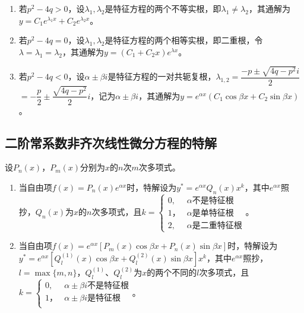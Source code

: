\documentclass[UTF8, 12pt]{ctexart}
\begin{document}
\begin{enumerate}
    \item 若$p^2-4q>0$，设$\lambda_1,\lambda_2$是特征方程的两个不等实根，即$\lambda_1\neq\lambda_2$，其通解为$y=C_1e^{\lambda_1x}+C_2e^{\lambda_2x}$。
    \item 若$p^2-4q=0$，设$\lambda_1,\lambda_2$是特征方程的两个相等实根，即二重根，令$\lambda=\lambda_1=\lambda_2$，其通解为$y=(C_1+C_2x)e^{\lambda x}$。
    \item 若$p^2-4q<0$，设$\alpha\pm\beta i$是特征方程的一对共轭复根，$\lambda_{1,2}=\dfrac{-p\pm\sqrt{4q-p^2}i}{2}$\\$=-\dfrac{p}{2}\pm\dfrac{\sqrt{4q-p^2}}{2}i$，记为$\alpha\pm\beta i$，其通解为$y=e^{\alpha x}(C_1\cos\beta x+C_2\sin\beta x)$。
\end{enumerate}

\subsection{二阶常系数非齐次线性微分方程的特解}

设$P_n(x)$，$P_m(x)$分别为$x$的$n$次$m$次多项式。

\begin{enumerate}
    \item 当自由项$f(x)=P_n(x)e^{\alpha x}$时，特解设为$y^*=e^{\alpha x}Q_n(x)x^k$，其中$e^{\alpha x}$照抄，$Q_n(x)$为$x$的$n$次多项式，且$k=\left\{\begin{array}{ll}
        0, & \alpha\text{不是特征根} \\
        1， & \alpha\text{是单特征根} \\
        2, & \alpha\text{是二重特征根}
    \end{array}\right.$。
    \item 当自由项$f(x)=e^{\alpha x}[P_m(x)\cos\beta x+P_n(x)\sin\beta x]$时，特解设为$y^*=e^{\alpha x}[Q_l^{(1)}(x)\cos\beta x+Q_l^{(2)}(x)\sin\beta x]x^k$，其中$e^{\alpha x}$照抄，$l=\max\{m,n\}$，$Q_l^{(1)}$、$Q_l^{(2)}$为$x$的两个不同的$l$次多项式，且$k=\left\{\begin{array}{ll}
        0, & \alpha\pm\beta i\text{不是特征根} \\
        1， & \alpha\pm\beta i\text{是特征根} \\
    \end{array}\right.$。
\end{enumerate}
\end{document}
